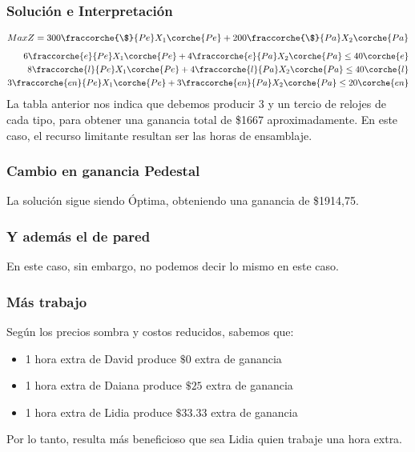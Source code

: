 \begin{homeworkProblem}

\subsubsection{Solución e Interpretación}
\begin{align*}
    Max Z = 300\fraccorche{\$}{Pe}X_1\corche{Pe} + 200\fraccorche{\$}{Pa}X_2\corche{Pa} \\
\end{align*}
\begin{align*}
    6\fraccorche{e}{Pe}X_1\corche{Pe} + 4\fraccorche{e}{Pa}X_2\corche{Pa} \le 40\corche{e} \\
    8\fraccorche{l}{Pe}X_1\corche{Pe} + 4\fraccorche{l}{Pa}X_2\corche{Pa} \le 40\corche{l} \\
    3\fraccorche{en}{Pe}X_1\corche{Pe} + 3\fraccorche{en}{Pa}X_2\corche{Pa} \le 20\corche{en} \\
\end{align*}
La tabla anterior nos indica que debemos producir 3 y un tercio de relojes de cada tipo, para obtener una ganancia total de \$1667 aproximadamente. En este caso, el recurso limitante resultan ser las horas de ensamblaje.

\subsubsection{Cambio en ganancia Pedestal}
La solución sigue siendo Óptima, obteniendo una ganancia de \$1914,75. \\
\subsubsection{Y además el de pared}
En este caso, sin embargo, no podemos decir lo mismo en este caso.
\subsubsection{Más trabajo}
Según los precios sombra y costos reducidos, sabemos que:
\begin{itemize}
    \item 1 hora extra de David produce $\$0$ extra de ganancia
    \item 1 hora extra de Daiana produce $\$25$ extra de ganancia
    \item 1 hora extra de Lidia produce $\$33.33$ extra de ganancia
\end{itemize}
Por lo tanto, resulta más beneficioso que sea Lidia quien trabaje una hora extra.


\end{homeworkProblem}
